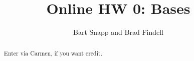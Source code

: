 \documentclass[handout,space,nooutcomes]{xourse}
\title{Online HW 0: Bases}
\author{Bart Snapp and Brad Findell}
\begin{document}
\begin{abstract}
Enter via Carmen, if you want credit.  
\end{abstract}
\maketitle

{}
\end{document}
